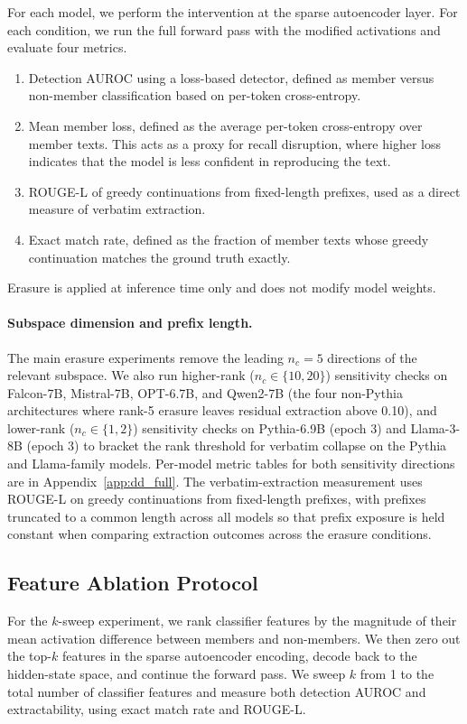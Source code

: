 For each model, we perform the intervention at the sparse autoencoder layer.
For each condition, we run the full forward pass with the modified activations and evaluate four metrics.
\begin{enumerate}
\item Detection AUROC using a loss-based detector, defined as member versus non-member classification based on per-token cross-entropy.
\item Mean member loss, defined as the average per-token cross-entropy over member texts. This acts as a proxy for recall disruption, where higher loss indicates that the model is less confident in reproducing the text.
\item ROUGE-L of greedy continuations from fixed-length prefixes, used as a direct measure of verbatim extraction.
\item Exact match rate, defined as the fraction of member texts whose greedy continuation matches the ground truth exactly.
\end{enumerate}
Erasure is applied at inference time only and does not modify model weights.

\paragraph{Subspace dimension and prefix length.}
The main erasure experiments remove the leading $n_c = 5$ directions of the relevant subspace. We also run higher-rank ($n_c \in \{10, 20\}$) sensitivity checks on Falcon-7B, Mistral-7B, OPT-6.7B, and Qwen2-7B (the four non-Pythia architectures where rank-5 erasure leaves residual extraction above 0.10), and lower-rank ($n_c \in \{1, 2\}$) sensitivity checks on Pythia-6.9B (epoch 3) and Llama-3-8B (epoch 3) to bracket the rank threshold for verbatim collapse on the Pythia and Llama-family models. Per-model metric tables for both sensitivity directions are in Appendix~\ref{app:dd_full}. The verbatim-extraction measurement uses ROUGE-L on greedy continuations from fixed-length prefixes, with prefixes truncated to a common length across all models so that prefix exposure is held constant when comparing extraction outcomes across the erasure conditions.

\subsection{Feature Ablation Protocol}
\label{app:ablation_details}

For the $k$-sweep experiment, we rank classifier features by the magnitude of their mean activation difference between members and non-members.
We then zero out the top-$k$ features in the sparse autoencoder encoding, decode back to the hidden-state space, and continue the forward pass.
We sweep $k$ from 1 to the total number of classifier features and measure both detection AUROC and extractability, using exact match rate and ROUGE-L.

